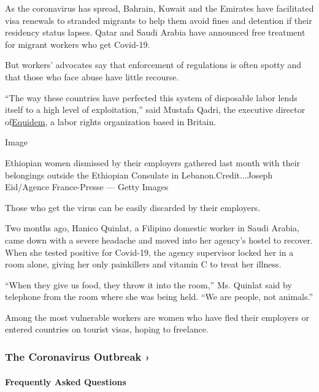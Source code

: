 As the coronavirus has spread, Bahrain, Kuwait and the Emirates have
facilitated visa renewals to stranded migrants to help them avoid fines
and detention if their residency status lapses. Qatar and Saudi Arabia
have announced free treatment for migrant workers who get Covid-19.

But workers' advocates say that enforcement of regulations is often
spotty and that those who face abuse have little recourse.

``The way these countries have perfected this system of disposable labor
lends itself to a high level of exploitation,'' said Mustafa Qadri, the
executive director of\href{https://www.equidemresearch.org/}{Equidem}, a
labor rights organization based in Britain.

Image

Ethiopian women dismissed by their employers gathered last month with
their belongings outside the Ethiopian Consulate in
Lebanon.Credit...Joseph Eid/Agence France-Presse --- Getty Images

Those who get the virus can be easily discarded by their employers.

Two months ago, Hanico Quinlat, a Filipino domestic worker in Saudi
Arabia, came down with a severe headache and moved into her agency's
hostel to recover. When she tested positive for Covid-19, the agency
supervisor locked her in a room alone, giving her only painkillers and
vitamin C to treat her illness.

``When they give us food, they throw it into the room,'' Ms. Quinlat
said by telephone from the room where she was being held. ``We are
people, not animals.''

Among the most vulnerable workers are women who have fled their
employers or entered countries on tourist visas, hoping to freelance.

\href{https://www.nytimes3xbfgragh.onion/news-event/coronavirus?action=click\&pgtype=Article\&state=default\&region=MAIN_CONTENT_3\&context=storylines_faq}{}

\hypertarget{the-coronavirus-outbreak-}{%
\subsubsection{The Coronavirus Outbreak
›}\label{the-coronavirus-outbreak-}}

\hypertarget{frequently-asked-questions}{%
\paragraph{Frequently Asked
Questions}\label{frequently-asked-questions}}

